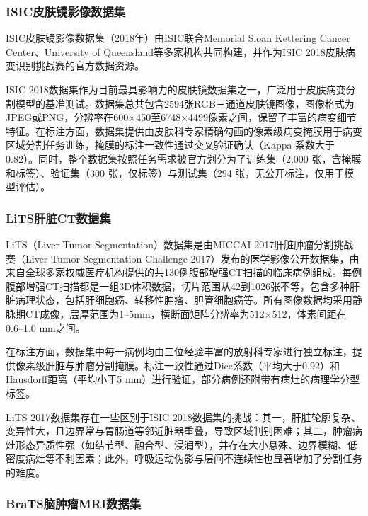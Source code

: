 \subsubsection{ISIC皮肤镜影像数据集}

ISIC皮肤镜影像数据集（2018年）由ISIC联合Memorial Sloan Kettering Cancer Center、University of Queensland等多家机构共同构建，并作为ISIC 2018皮肤病变识别挑战赛的官方数据资源\cite{codella2019skinlesionanalysismelanoma}。

ISIC 2018数据集作为目前最具影响力的皮肤镜数据集之一，广泛用于皮肤病变分割模型的基准测试。数据集总共包含2594张RGB三通道皮肤镜图像，图像格式为JPEG或PNG，分辨率在600×450至6748×4499像素之间，保留了丰富的病变细节特征。在标注方面，数据集提供由皮肤科专家精确勾画的像素级病变掩膜用于病变区域分割任务训练，掩膜的标注一致性通过交叉验证确认（Kappa 系数大于 0.82）。同时，整个数据集按照任务需求被官方划分为了训练集（2,000 张，含掩膜和标签）、验证集（300 张，仅标签）与测试集（294 张，无公开标注，仅用于模型评估）。

\subsubsection{LiTS肝脏CT数据集}

LiTS（Liver Tumor Segmentation）数据集是由MICCAI 2017肝脏肿瘤分割挑战赛（Liver Tumor Segmentation Challenge 2017）发布的医学影像公开数据集，由来自全球多家权威医疗机构提供的共130例腹部增强CT扫描的临床病例组成。每例腹部增强CT扫描都是一组3D体积数据，切片范围从42到1026张不等，包含多种肝脏病理状态，包括肝细胞癌、转移性肿瘤、胆管细胞癌等\cite{Bilic_2023}。所有图像数据均采用静脉期CT成像，层厚范围为1–5mm，横断面矩阵分辨率为512×512，体素间距在0.6–1.0 mm之间。

在标注方面，数据集中每一病例均由三位经验丰富的放射科专家进行独立标注，提供像素级肝脏与肿瘤分割掩膜。标注一致性通过Dice系数（平均大于0.92）和Hausdorff距离（平均小于5 mm）进行验证，部分病例还附带有病灶的病理学分型标签。

LiTS 2017数据集存在一些区别于ISIC 2018数据集的挑战：其一，肝脏轮廓复杂、变异性大，且边界常与胃肠道等邻近脏器重叠，导致区域判别困难；其二，肿瘤病灶形态异质性强（如结节型、融合型、浸润型），并存在大小悬殊、边界模糊、低密度病灶等不利因素；此外，呼吸运动伪影与层间不连续性也显著增加了分割任务的难度。

\subsubsection{BraTS脑肿瘤MRI数据集}

